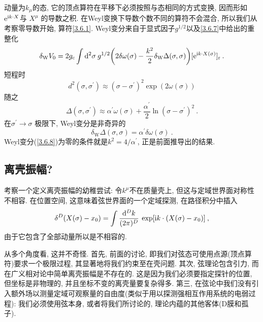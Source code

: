 动量为$k_\mu$的态, 它的顶点算符在平移下必须按照与态相同的方式变换, 因而形如$\mathrm{e}^{\mathrm{i} k\cdot X}$与 $X^\mu$ 的导数之积.
在Weyl变换下导数个数不同的算符不会混合, 所以我们从考察零导数开始, 算符\eqref{3.6.1}. Weyl变分来自于显式因子$g^{1/2}$以及\eqref{3.6.7}中给出的重整化
\begin{equation}\label{3.6.8}
\delta_{\mathrm{W}} V_{0}=2 g_{\mathrm{c}} \int \mathrm{d}^{2} \sigma \: g^{1 / 2}\biggl(2 \delta \omega(\sigma)-\frac{k^{2}}{2} \delta_{\mathrm{W}} \Delta(\sigma, \sigma)\biggr) [\mathrm{e}^{\mathrm{i} k \cdot X(\sigma)}]_{\mathrm{r}} \:.
\end{equation}
短程时
\begin{equation}
d^{2}(\sigma, \sigma^{\prime}) \approx(\sigma-\sigma^{\prime})^{2} \exp (2 \omega(\sigma)) \label{3.6.9}
\end{equation}
随之
\begin{equation}
\Delta(\sigma, \sigma^{\prime}) \approx \alpha^{\prime} \omega(\sigma)+\frac{\alpha^{\prime}}{2} \ln (\sigma-\sigma^{\prime})^{2} \:. \label{3.6.10}
\end{equation}
在$\sigma^{\prime} \rightarrow \sigma$ 极限下, Weyl变分是非奇异的
\begin{equation}\label{3.6.11}
\delta_{\mathrm{W}} \Delta(\sigma, \sigma)=\alpha^{\prime} \delta \omega(\sigma) \:.
\end{equation}
Weyl变分(\ref{3.6.8})为零的条件就是$k^{2}=4 / \alpha^{\prime}$, 正是前面推导出的结果.


\subsection*{离壳振幅?}

考察一个定义离壳振幅的幼稚尝试: 令$k^\mu$不在质量壳上, 但这与定域世界面对称性不相容. 在位置空间, 这意味着弦世界面的一个定域探测, 在路径积分中插入
\begin{equation}\label{3.6.12}
\delta^{D}(X(\sigma)-x_{0})=\int \frac{\mathrm{d}^{D} k}{(2 \pi)^{D}} \: \exp [\mathrm{i} k \cdot(X(\sigma)-x_{0})] \:,
\end{equation}
由于它包含了全部动量所以是不相容的.

从多个角度看, 这并不奇怪. 首先, 前面的讨论, 即我们对弦态可使用点源(顶点算符)要求一个极限过程, 其显著地将我们约束至在壳问题. 
其次, 弦理论包含引力, 而在广义相对论中简单离壳振幅是不存在的. 这是因为我们必须要指定探针的位置, 但坐标是非物理的, 并且坐标不变的离壳量要复杂得多. 第三, 在弦论中我们没有引入额外场以测量定域可观察量的自由度(类似于用以探测强相互作用系统的电弱过程): 我们必须使用弦本身, 或者将我们所讨论的, 理论内蕴的其他客体(D膜和孤子). 

